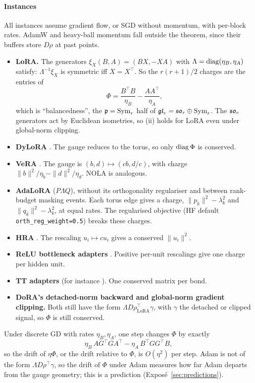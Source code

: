 \paragraph{Instances} All instances assume gradient flow, or SGD without momentum, with per-block rates. AdamW and heavy-ball momentum fall outside the theorem, since their buffers store $D\rho$ at past points.
\begin{itemize}
\item \textbf{LoRA.} The generators $\xi_X(B,A)=(BX,-XA)$ with $\Lambda=\operatorname{diag}(\eta_B,\eta_A)$ satisfy: $\Lambda^{-1}\xi_X$ is symmetric iff $X=X^\top$. So the $r(r+1)/2$ charges are the entries of
\[\Phi=\frac{B^\top B}{\eta_B}-\frac{AA^\top}{\eta_A},\]
which is ``balancedness'', the $\mathfrak p=\mathrm{Sym}_r$ half of $\mathfrak{gl}_r=\mathfrak{so}_r\oplus\mathrm{Sym}_r$. The $\mathfrak{so}_r$ generators act by Euclidean isometries, so (ii) holds for LoRA even under global-norm clipping.
\item \textbf{DyLoRA} \citep{valipour2022dylora}. The gauge reduces to the torus, so only $\operatorname{diag}\Phi$ is conserved.
\item \textbf{VeRA} \citep{kopiczko2023vera}. The gauge is $(b,d)\mapsto(cb,d/c)$, with charge $\|b\|^2/\eta_b-\|d\|^2/\eta_d$. NOLA \citep{koohpayegani2023nola} is analogous.
\item \textbf{AdaLoRA} \citep{zhang2023adalora} ($P\Lambda Q$), without its orthogonality regulariser and between rank-budget masking events. Each torus edge gives a charge, $\|p_k\|^2-\lambda_k^2$ and $\|q_k\|^2-\lambda_k^2$, at equal rates. The regularised objective (HF default \texttt{orth\_reg\_weight=0.5}) breaks these charges.
\item \textbf{HRA} \citep{yuan2024bridging}. The rescaling $u_i\mapsto cu_i$ gives a conserved $\|u_i\|^2$.
\item \textbf{ReLU bottleneck adapters} \citep{houlsby2019parameter}. Positive per-unit rescalings give one charge per hidden unit.
\item \textbf{TT adapters} (for instance \citealp{yang2024loretta,anjum2024tensor}). One conserved matrix per bond.
\item \textbf{DoRA's detached-norm backward \citep{liu2024dora} and global-norm gradient clipping.} Both still have the form $\Lambda D\rho_{\mathrm{LoRA}}^\top\gamma$, with $\gamma$ the detached or clipped signal, so $\Phi$ is still conserved.
\end{itemize}

Under discrete GD with rates $\eta_B,\eta_A$, one step changes $\Phi$ by exactly
\[\eta_B\,AG^\top GA^\top-\eta_A\,B^\top GG^\top B,\]
so the drift of $\eta\Phi$, or the drift relative to $\Phi$, is $O(\eta^2)$ per step. Adam is not of the form $\Lambda D\rho^\top\gamma$, so the drift of $\Phi$ under Adam measures how far Adam departs from the gauge geometry; this is a prediction (Exposé~\ref{sec:predictions}).

